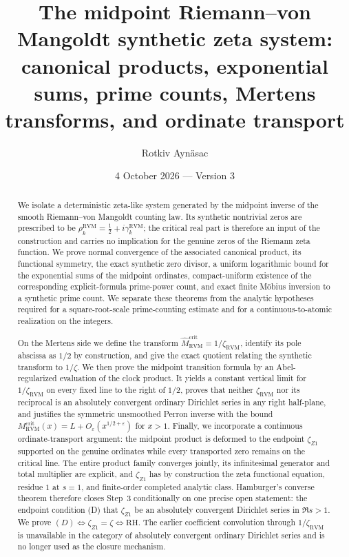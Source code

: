 \documentclass[11pt,reqno]{amsart}
\title[The midpoint RVM synthetic zeta system]{The midpoint Riemann--von Mangoldt synthetic zeta system:\\
canonical products, exponential sums, prime counts, Mertens transforms, and ordinate transport}
\author{Rotkiv Ayn\"asac\\[2pt]\NoCaseChange{\normalfont\texttt{rotkivanyasac@gmail.com}}}
\date{4 October 2026 --- Version 3}
\theoremstyle{definition}
\theoremstyle{remark}
\newcommand{\RVM}{\mathrm{RVM}}
\newcommand{\crit}{\mathrm{crit}}
\begin{document}
\begin{abstract}
We isolate a deterministic zeta-like system generated by the midpoint inverse of the smooth Riemann--von Mangoldt counting law.  Its synthetic nontrivial zeros are prescribed to be
$\rho_k^{\RVM}=\tfrac12+i\gamma_k^{\RVM}$; the critical real part is therefore an input of the construction and carries no implication for the genuine zeros of the Riemann zeta function.  We prove normal convergence of the associated canonical product, its functional symmetry, the exact synthetic zero divisor, a uniform logarithmic bound for the exponential sums of the midpoint ordinates, compact-uniform existence of the corresponding explicit-formula prime-power count, and exact finite M\"obius inversion to a synthetic prime count.  We separate these theorems from the analytic hypotheses required for a square-root-scale prime-counting estimate and for a continuous-to-atomic realization on the integers.

On the Mertens side we define the transform $\widehat M_{\RVM}^{\crit}=1/\zeta_{\RVM}$, identify its pole abscissa as $1/2$ by construction, and give the exact quotient relating the synthetic transform to $1/\zeta$.  We then prove the midpoint transition formula by an Abel-regularized evaluation of the clock product.  It yields a constant vertical limit for $1/\zeta_{\RVM}$ on every fixed line to the right of $1/2$, proves that neither $\zeta_{\RVM}$ nor its reciprocal is an absolutely convergent ordinary Dirichlet series in any right half-plane, and justifies the symmetric unsmoothed Perron inverse with the bound $M_{\RVM}^{\crit}(x)=L+O_\varepsilon(x^{1/2+\varepsilon})$ for $x>1$.  Finally, we incorporate a continuous ordinate-transport argument: the midpoint product is deformed to the endpoint $\zeta_{Z1}$ supported on the genuine ordinates while every transported zero remains on the critical line.  The entire product family converges jointly, its infinitesimal generator and total multiplier are explicit, and $\zeta_{Z1}$ has by construction the zeta functional equation, residue $1$ at $s=1$, and finite-order completed analytic class.  Hamburger's converse theorem therefore closes Step~3 conditionally on one precise open statement: the endpoint condition (D) that $\zeta_{Z1}$ be an absolutely convergent Dirichlet series in $\Re s>1$.  We prove $(D)\Longleftrightarrow\zeta_{Z1}=\zeta\Longleftrightarrow\mathrm{RH}$.  The earlier coefficient convolution through $1/\zeta_{\RVM}$ is unavailable in the category of absolutely convergent ordinary Dirichlet series and is no longer used as the closure mechanism.
\end{abstract}
\maketitle
{}
\end{document}
